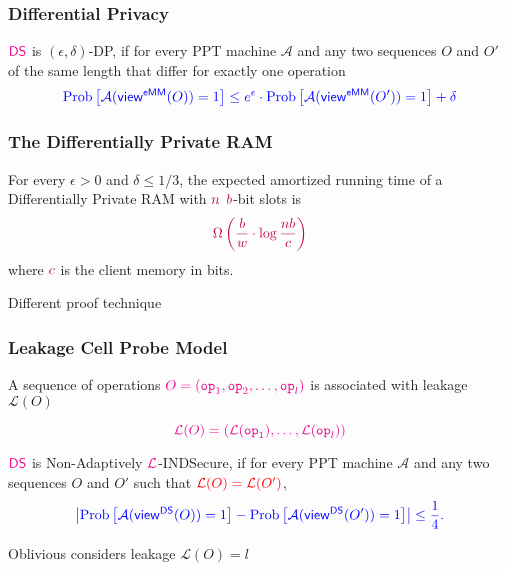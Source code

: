 \documentclass[]{beamer}
\newcommand{\view}{{\mathsf{view}}}
\newcommand{\DS}{{\mathsf{DS}}}
\newcommand{\emm}{{\mathsf{eMM}}}
\newcommand{\op}{{\mathtt{op}}}
\newcommand{\calA}{\mathcal{A}}
\newcommand{\calL}{\mathcal{L}}
\begin{document}
    \begin{frame}
    \frametitle{Differential Privacy}
    \begin{definition}
    $\color{magenta}\DS$ is {\color{blue} $(\epsilon,\delta)$-DP},
    if for every PPT machine $\calA$ and any two sequences $O$ and $O'$ of the 
    {\color{red} same length}
    that differ for {\color{red} exactly one operation}
    $$\color{blue} 
        \text{Prob}\left[\calA(\view^\emm(O))=1\right]
        \leq e^\epsilon\cdot\text{Prob}\left[\calA(\view^\emm(O'))=1\right]+\delta
        $$
    \end{definition}
    \end{frame}

    \begin{frame}
    \frametitle{The Differentially Private RAM}
    \begin{theorem}[P+Yeo '19]
    For every $\epsilon>0$ and $\delta\leq 1/3$, the 
    expected amortized running time of a {\color{red} Differentially Private RAM} 
with $\color{purple} n$ $\color{purple} b$-bit slots is
    $$\color{purple} \Omega\left(
    \frac{b}{w}\cdot\log\frac{nb}{c}
                    \right)$$
    where $\color{purple} c$ is the client memory in bits.
    \end{theorem}

\pause
\vfill
\alert{Different proof technique}
\end{frame}

\begin{frame}
\frametitle{Leakage Cell Probe Model}

A sequence of operations $\color{magenta} O=(\op_1,\op_2,\ldots,\op_l)$
is associated with {\color{magenta} leakage $\calL(O)$}

$$\color{magenta}\calL(O)=(\calL(\op_1),\ldots,\calL(\op_l))$$

\pause

\begin{definition}
$\color{magenta}\DS$ is {\color{blue} Non-Adaptively $\color{magenta} \calL$-INDSecure},
if for every PPT machine $\calA$ and any two sequences $O$ and $O'$ such that
$\color{red}\calL(O)=\calL(O')$, 
$$\color{blue} \left|
    \text{Prob}\left[\calA(\view^\DS(O))=1\right]
        -
    \text{Prob}\left[\calA(\view^\DS(O'))=1\right]
    \right|\leq \frac{1}{4}.$$
\end{definition}
\pause
\vfill
{\color{olive} Oblivious considers leakage $\calL(O)=l$}
\end{frame}
\end{document}
